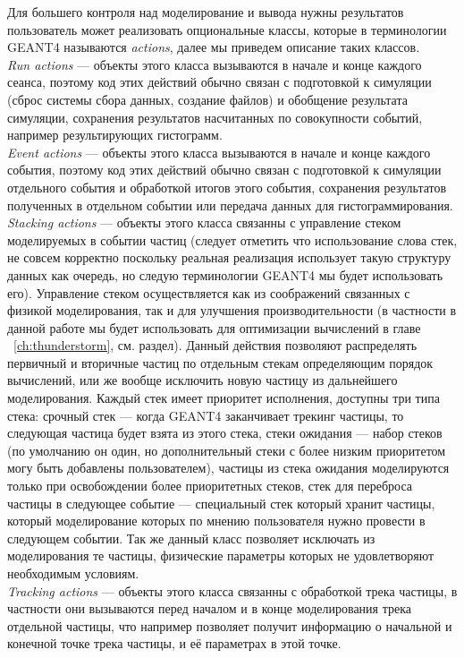 Для большего контроля над моделирование и вывода нужны результатов пользователь может реализовать опциональные классы, которые в терминологии GEANT4 называются \textit{actions}, далее мы приведем описание таких классов.\\
\textit{Run actions} --- объекты этого класса вызываются в начале и конце каждого сеанса, поэтому код этих действий обычно связан с  подготовкой к симуляции (сброс системы сбора данных, создание файлов) и обобщение результата симуляции, сохранения результатов насчитанных по совокупности событий, например результирующих гистограмм.\\
\textit{Event actions} ---  объекты этого класса вызываются в начале и конце каждого события,  поэтому код этих действий обычно связан с  подготовкой к симуляции отдельного события и обработкой итогов этого события, сохранения результатов полученных в отдельном событии или передача данных для гистограммирования. \\
\textit{Stacking actions} --- объекты этого класса связанны с управление стеком моделируемых в событии частиц (следует отметить что использование слова стек, не совсем корректно поскольку реальная реализация использует такую структуру данных как очередь, но следую терминологии GEANT4 мы будет использовать его). Управление стеком осуществляется как из соображений связанных с физикой моделирования, так и для улучшения производительности (в частности в данной работе мы будет использовать для оптимизации вычислений в главе ~\ref{ch:thunderstorm}, см. раздел). Данный действия позволяют распределять первичный и вторичные частиц по отдельным стекам определяющим порядок вычислений, или же вообще исключить новую частицу из дальнейшего моделирования. Каждый стек имеет приоритет исполнения, доступны три типа стека: срочный стек  --- когда GEANT4 заканчивает трекинг частицы, то следующая частица будет взята из этого стека, стеки ожидания --- набор стеков (по умолчанию он один, но дополнительный стеки с более низким приоритетом могу быть добавлены пользователем), частицы из стека ожидания моделируются только при освобождении более приоритетных стеков, стек для переброса частицы в следующее событие --- специальный стек который хранит частицы, который моделирование которых по мнению пользователя нужно провести в следующем событии. Так же данный класс позволяет исключать из моделирования те  частицы, физические параметры которых не удовлетворяют необходимым условиям.\\
\textit{Tracking actions} --- объекты этого класса связанны с обработкой трека частицы, в частности они вызываются перед началом и в конце моделирования трека отдельной частицы, что например позволяет получит информацию о начальной и конечной точке трека частицы, и её параметрах в этой точке.\\
